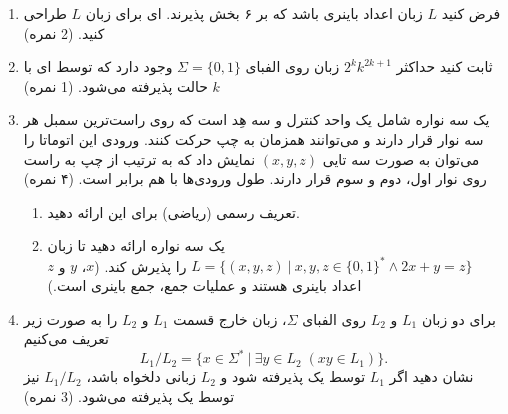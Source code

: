 \documentclass{article}
\begin{document}
	\begin{enumerate}
		\item 
		فرض کنید $L$ زبان اعداد باینری باشد که بر ۶ بخش پذیرند. ای برای زبان $L$ طراحی کنید. (2 نمره)
		\item 
		ثابت کنید حداکثر
		$2^kk^{2k+1}$
		زبان روی الفبای $\Sigma = \{0, 1\}$ وجود دارد که توسط ای با $ k $ حالت
		 پذیرفته می‌شود. (1 نمره)
		\item 
		یک 
		سه نواره شامل یک واحد کنترل و سه هِد است که روی راست‌ترین سمبل هر سه نوار قرار دارند و ‌می‌توانند همزمان به چپ حرکت ‌کنند. ورودی این اتوماتا را می‌توان به صورت سه تایی 
		$(x,y,z)$
		نمایش داد که به ترتیب از چپ به راست روی نوار اول، دوم و سوم قرار دارند. طول ورودی‌ها با هم برابر است. (۴ نمره‌)
		\begin{enumerate}
			\item 
			تعریف رسمی (ریاضی) برای این 
			ارائه دهید.
			\item
			یک 
			سه نواره ارائه دهید تا زبان 
			$L = \{(x,y,z) \:|\: x,y,z \in \{0,1\}^* \wedge 2x+y=z\}$
			را پذیرش کند. ($x$، $y$ و $z$ اعداد باینری هستند و عملیات جمع، جمع باینری است.)
		\end{enumerate}
	 		\item
	برای دو زبان $L_1 $ و $L_2 $ روی الفبای $\Sigma $، زبان خارج قسمت  $L_1 $ و $L_2 $ را به صورت زیر تعریف می‌کنیم 
	$$L_1/L_2 = \{x \in \Sigma^* \:|\: \exists y \in L_2 \; (xy \in L_1)\}.$$
	نشان دهید اگر $L_1$ توسط یک  پذیرفته شود و $L_2$ زبانی دلخواه باشد، $L_1/L_2$ نیز توسط یک  پذیرفته می‌شود. (3 نمره)
	\end{enumerate}
\end{document}
